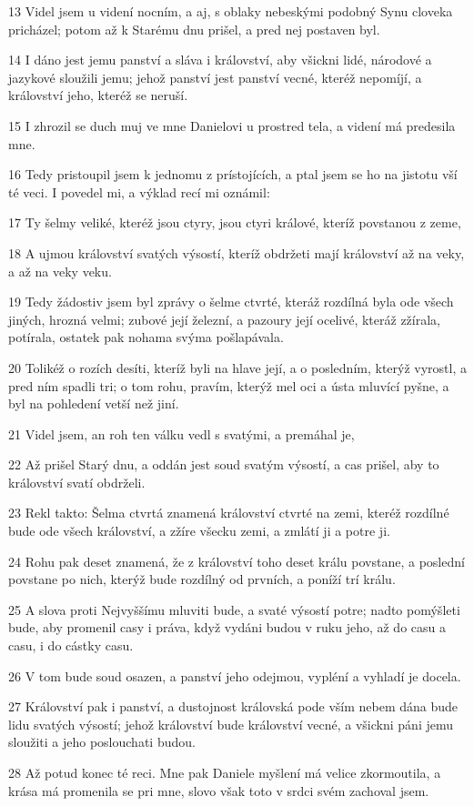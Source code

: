 \par 13 Videl jsem u videní nocním, a aj, s oblaky nebeskými podobný Synu cloveka pricházel; potom až k Starému dnu prišel, a pred nej postaven byl.
\par 14 I dáno jest jemu panství a sláva i království, aby všickni lidé, národové a jazykové sloužili jemu; jehož panství jest panství vecné, kteréž nepomíjí, a království jeho, kteréž se neruší.
\par 15 I zhrozil se duch muj ve mne Danielovi u prostred tela, a videní má predesila mne.
\par 16 Tedy pristoupil jsem k jednomu z prístojících, a ptal jsem se ho na jistotu vší té veci. I povedel mi, a výklad recí mi oznámil:
\par 17 Ty šelmy veliké, kteréž jsou ctyry, jsou ctyri králové, kteríž povstanou z zeme,
\par 18 A ujmou království svatých výsostí, kteríž obdržeti mají království až na veky, a až na veky veku.
\par 19 Tedy žádostiv jsem byl zprávy o šelme ctvrté, kteráž rozdílná byla ode všech jiných, hrozná velmi; zubové její železní, a pazoury její ocelivé, kteráž zžírala, potírala, ostatek pak nohama svýma pošlapávala.
\par 20 Tolikéž o rozích desíti, kteríž byli na hlave její, a o posledním, kterýž vyrostl, a pred ním spadli tri; o tom rohu, pravím, kterýž mel oci a ústa mluvící pyšne, a byl na pohledení vetší než jiní.
\par 21 Videl jsem, an roh ten válku vedl s svatými, a premáhal je,
\par 22 Až prišel Starý dnu, a oddán jest soud svatým výsostí, a cas prišel, aby to království svatí obdrželi.
\par 23 Rekl takto: Šelma ctvrtá znamená království ctvrté na zemi, kteréž rozdílné bude ode všech království, a zžíre všecku zemi, a zmlátí ji a potre ji.
\par 24 Rohu pak deset znamená, že z království toho deset králu povstane, a poslední povstane po nich, kterýž bude rozdílný od prvních, a poníží trí králu.
\par 25 A slova proti Nejvyššímu mluviti bude, a svaté výsostí potre; nadto pomýšleti bude, aby promenil casy i práva, když vydáni budou v ruku jeho, až do casu a casu, i do cástky casu.
\par 26 V tom bude soud osazen, a panství jeho odejmou, vypléní a vyhladí je docela.
\par 27 Království pak i panství, a dustojnost královská pode vším nebem dána bude lidu svatých výsostí; jehož království bude království vecné, a všickni páni jemu sloužiti a jeho poslouchati budou.
\par 28 Až potud konec té reci. Mne pak Daniele myšlení má velice zkormoutila, a krása má promenila se pri mne, slovo však toto v srdci svém zachoval jsem.

